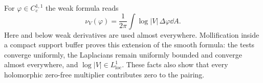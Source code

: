 For $\varphi\in C_c^{1,1}$ the weak formula reads
\begin{equation}\label{eq:weak-onepoint}
 \nu_V(\varphi)=\frac1{2\pi}
       \int\log|V|\,\Delta\varphi\dd A .
\end{equation}
Here and below weak derivatives are used almost everywhere.
Mollification inside a compact support buffer proves this extension
of the smooth formula: the tests converge uniformly, the Laplacians
remain uniformly bounded and converge almost everywhere, and
$\log|V|\in L^1_{\mathrm{loc}}$. These facts also show that every
holomorphic zero-free multiplier contributes zero to the pairing.

